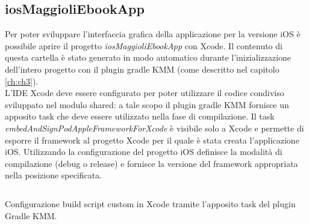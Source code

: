 \subsection{iosMaggioliEbookApp}

Per poter sviluppare l'interfaccia grafica della applicazione per la versione iOS è possibile aprire il progetto \textit{iosMaggioliEbookApp} con Xcode. Il contenuto di questa cartella è stato generato in modo automatico durante l'inizializzazione dell'intero progetto con il plugin gradle KMM (come descritto nel capitolo \ref{ch:ch3}).\\
L'IDE Xcode deve essere configurato per poter utilizzare il codice condiviso sviluppato nel modulo shared: a tale scopo il plugin gradle KMM fornisce un apposito task che deve essere utilizzato nella fase di compilazione. Il task \textit{embedAndSignPodAppleFrameworkForXcode} è visibile solo a Xcode e permette di esporre il framework al progetto Xcode per il quale è stata creata l'applicazione iOS. Utilizzando la configurazione del progetto iOS definisce la modalità di compilazione (debug o release) e fornisce la versione del framework appropriata nella posizione specificata.

\begin{listing}[H]
\inputminted{bash}{code/5-xcodeconfigkmm}
\caption{Configurazione build script custom in Xcode tramite l'apposito task del plugin Gradle KMM.}
\end{listing}

